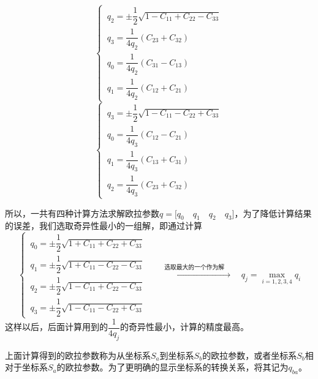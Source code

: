 \begin{equation}
	\begin{cases}
		\, q_2 = \pm \dfrac{1}{2} \sqrt{1 - C_{11} + C_{22} - C_{33}} \\[0.8em]
		\, q_3 = \dfrac{1}{4q_2}(C_{23} + C_{32}) \\[0.8em]
		\, q_0 = \dfrac{1}{4q_2}(C_{31} - C_{13}) \\[0.8em]
		\, q_1 = \dfrac{1}{4q_2}(C_{12} + C_{21})
	\end{cases}
\end{equation}
\clearpage
\vspace*{-3em}
\begin{equation}
	\begin{cases}
		\, q_3 = \pm \dfrac{1}{2} \sqrt{1 - C_{11} - C_{22} + C_{33}} \\[0.8em]
		\, q_0 = \dfrac{1}{4q_3}(C_{12} - C_{21}) \\[0.8em]
		\, q_1 = \dfrac{1}{4q_3}(C_{13} + C_{31}) \\[0.8em]
		\, q_2 = \dfrac{1}{4q_3}(C_{23} + C_{32})
	\end{cases}
\end{equation}

所以，一共有四种计算方法求解欧拉参数$q = \big[ q_0 \quad q_1 \quad q_2 \quad q_3 \big]$，为了降低计算结果的误差，我们选取奇异性最小的一组解，即通过计算
\begin{equation}
	\begin{cases}
		\, q_0 =  \pm \dfrac{1}{2} \sqrt{1 + C_{11} + C_{22} + C_{33}} \\[0.8em]
		\, q_1 = \pm \dfrac{1}{2} \sqrt{1 + C_{11} - C_{22} - C_{33}} \\[0.8em]
		\, q_2 = \pm \dfrac{1}{2} \sqrt{1 - C_{11} + C_{22} - C_{33}} \\[0.8em]
		\, q_3 = \pm \dfrac{1}{2} \sqrt{1 - C_{11} - C_{22} + C_{33}}
	\end{cases}
\quad 
\xrightarrow{\quad \textstyle \mbox{选取最大的一个作为解} \quad } \quad 
	q_j = \max_{i = 1,2,3,4} q_i
\end{equation}
这样以后，后面计算用到的$\dfrac{1}{4q_j}$的奇异性最小，计算的精度最高。
\vspace*{0.5em}

上面计算得到的欧拉参数称为从坐标系$S_a$到坐标系$S_b$的欧拉参数，或者坐标系$S_b$相对于坐标系$S_a$的欧拉参数。为了更明确的显示坐标系的转换关系，将其记为$q_{ba}$。
\vspace*{1em}


\sssection[相继转动的欧拉参数表示]

